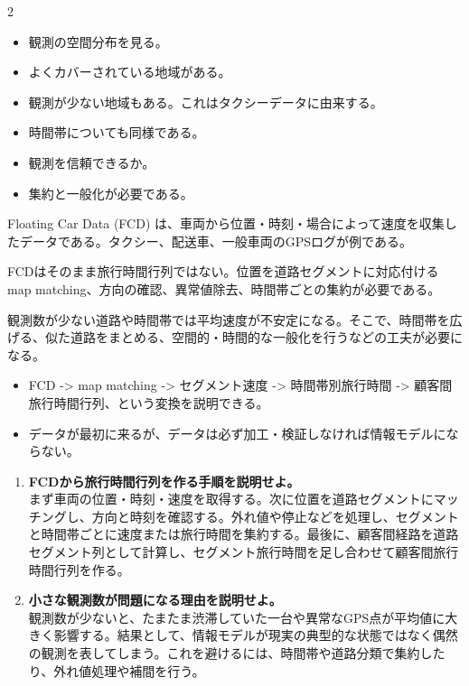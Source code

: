 \clearpage
{}
\begin{multicols}{2}\footnotesize\raggedcolumns
{}
\begin{itemize}
\item 観測の空間分布を見る。
\item よくカバーされている地域がある。
\item 観測が少ない地域もある。これはタクシーデータに由来する。
\item 時間帯についても同様である。
\item 観測を信頼できるか。
\item 集約と一般化が必要である。
\end{itemize}
Floating Car Data (FCD) は、車両から位置・時刻・場合によって速度を収集したデータである。タクシー、配送車、一般車両のGPSログが例である。\par

FCDはそのまま旅行時間行列ではない。位置を道路セグメントに対応付ける map matching、方向の確認、異常値除去、時間帯ごとの集約が必要である。\par

観測数が少ない道路や時間帯では平均速度が不安定になる。そこで、時間帯を広げる、似た道路をまとめる、空間的・時間的な一般化を行うなどの工夫が必要になる。\par
{}
\begin{itemize}
\item FCD -> map matching -> セグメント速度 -> 時間帯別旅行時間 -> 顧客間旅行時間行列、という変換を説明できる。
\item データが最初に来るが、データは必ず加工・検証しなければ情報モデルにならない。
\end{itemize}
\begin{enumerate}
\item \textbf{FCDから旅行時間行列を作る手順を説明せよ。}\\まず車両の位置・時刻・速度を取得する。次に位置を道路セグメントにマッチングし、方向と時刻を確認する。外れ値や停止などを処理し、セグメントと時間帯ごとに速度または旅行時間を集約する。最後に、顧客間経路を道路セグメント列として計算し、セグメント旅行時間を足し合わせて顧客間旅行時間行列を作る。
\item \textbf{小さな観測数が問題になる理由を説明せよ。}\\観測数が少ないと、たまたま渋滞していた一台や異常なGPS点が平均値に大きく影響する。結果として、情報モデルが現実の典型的な状態ではなく偶然の観測を表してしまう。これを避けるには、時間帯や道路分類で集約したり、外れ値処理や補間を行う。
\end{enumerate}
\end{multicols}

